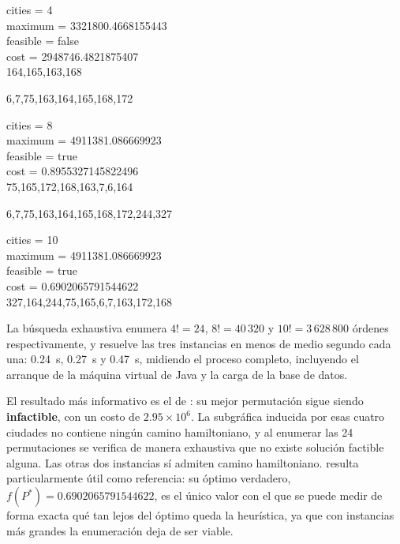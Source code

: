 \documentclass[9pt,a4paper,twocolumn,twoside]{tau-class/tau}
\begin{document}
\begin{tauenv}[frametitle=Salida exhaustiva para input-4.tsp]
    \small\ttfamily\raggedright
    cities = 4\\
    maximum = 3321800.4668155443\\
    feasible = false\\
    cost = 2948746.4821875407\\
    164,165,163,168
\end{tauenv}

\begin{tauenv}[frametitle=input-8.tsp]
    \small\ttfamily\raggedright
    6,7,75,163,164,165,168,172
\end{tauenv}

\begin{tauenv}[frametitle=Salida exhaustiva para input-8.tsp]
    \small\ttfamily\raggedright
    cities = 8\\
    maximum = 4911381.086669923\\
    feasible = true\\
    cost = 0.8955327145822496\\
    75,165,172,168,163,7,6,164
\end{tauenv}

\begin{tauenv}[frametitle=input-10.tsp]
    \small\ttfamily\raggedright
    6,7,75,163,164,165,168,172,244,327
\end{tauenv}

\begin{tauenv}[frametitle=Salida exhaustiva para input-10.tsp]
    \small\ttfamily\raggedright
    cities = 10\\
    maximum = 4911381.086669923\\
    feasible = true\\
    cost = 0.6902065791544622\\
    327,164,244,75,165,6,7,163,172,168
\end{tauenv}

La búsqueda exhaustiva enumera $4! = 24$, $8! = 40\,320$ y $10! = 3\,628\,800$ órdenes respectivamente, y resuelve las tres instancias en menos de medio segundo cada una: 0.24~s, 0.27~s y 0.47~s, midiendo el proceso completo, incluyendo el arranque de la máquina virtual de Java y la carga de la base de datos.

El resultado más informativo es el de : su mejor permutación sigue siendo \textbf{infactible}, con un costo de $2.95\times10^{6}$. La subgráfica inducida por esas cuatro ciudades no contiene ningún camino hamiltoniano, y al enumerar las 24 permutaciones se verifica de manera exhaustiva que no existe solución factible alguna. Las otras dos instancias sí admiten camino hamiltoniano.  resulta particularmente útil como referencia: su óptimo verdadero, $f(P^*) = 0.6902065791544622$, es el único valor con el que se puede medir de forma exacta qué tan lejos del óptimo queda la heurística, ya que con instancias m\'as grandes la enumeración deja de ser viable.
\end{document}
